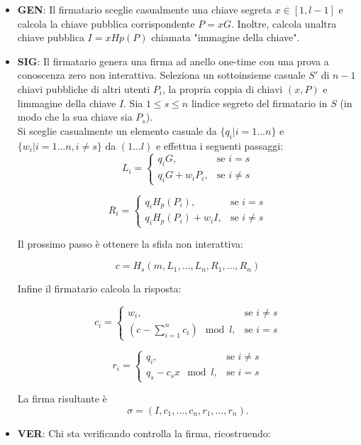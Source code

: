 \begin{itemize}
  \item
    \textbf{GEN}: Il firmatario sceglie casualmente una chiave segreta $x \in
    [1,l-1]$ e calcola la chiave pubblica corrispondente $P=xG$. Inoltre,
    calcola un\textquotesingle altra chiave pubblica $I=xHp(P)$ chiamata
    "immagine della chiave".
  \item
    \textbf{SIG}: Il firmatario genera una firma ad anello one-time con
    una prova a conoscenza zero non interattiva. Seleziona un sottoinsieme
    casuale $S'$ di $n - 1$ chiavi pubbliche di altri utenti $P_i$,
    la propria coppia di chiavi $(x, P)$ e l\textquotesingle immagine della
    chiave $I$. Sia $1 \leq s \leq n$ l\textquotesingle indice segreto del firmatario in
    $S$ (in modo che la sua chiave sia $P_s$).\\
    Si sceglie casualmente un elemento casuale da $\{q_i | i = 1
    ... n\}$ e $\{w_i | i = 1 ... n, i \neq s\}$ da $(1 ... l)$ e effettua
    i seguenti passaggi:
    \[ L_i = \begin{cases} q_iG, & \text{se } i = s \\ q_iG+w_iP_i, & \text{se } i \neq s \end{cases} \]


\[ R_i = \begin{cases} q_iH_p(P_i), & \text{se } i = s \\ q_iH_p(P_{i})+ w_iI, & \text{se } i \neq s \end{cases} \]

Il prossimo passo è ottenere la sfida non interattiva:

\[ c = H_s(m, L_1, \ldots, L_n, R_1, \ldots, R_n) \]

Infine il firmatario calcola la risposta:

\[ c_i = \begin{cases} w_i, & \text{se } i \neq s \\ \left(c -\sum_{i=1}^{n} c_i\right) \mod l, & \text{se } i = s \end{cases} \]

\[ r_i = \begin{cases} q_i, & \text{se } i \neq s \\ q_s - c_sx \mod l ,& \text{se } i=s \end{cases} \]

La firma risultante è \[ \sigma= (I,c_1,\ldots,c_n,r_1,\ldots,r_n). \]

\item 
  \textbf{VER}: Chi sta verificando controlla la firma, ricostruendo:


\end{itemize}
